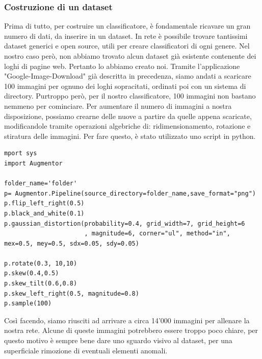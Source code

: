 \documentclass[twoside]{supsistudent}
\newcommand{\Decaa}{\newline\vspace{0.5mm}\newline\noindent}
\begin{document}
\subsubsection{Costruzione di un dataset}
Prima di tutto, per costruire un classificatore, è fondamentale ricavare un gran numero di dati, da inserire in un dataset.
In rete è possibile trovare tantissimi dataset generici e open source, utili per creare classificatori di ogni genere.
Nel nostro caso però, non abbiamo trovato alcun dataset già esistente contenente dei loghi di pagine web. Pertanto lo abbiamo creato noi.\Decaa
Tramite l'applicazione "Google-Image-Download" già descritta in precedenza, siamo andati a scaricare 100 immagini per ognuno dei loghi sopracitati, ordinati poi con un sistema di directory. Purtroppo però, per il nostro classificatore, 100 immagini non bastano nemmeno per cominciare. Per aumentare il numero di immagini a nostra disposizione, possiamo crearne delle nuove a partire da quelle appena scaricate, modificandole tramite operazioni algebriche di: ridimensionamento, rotazione e stiratura delle immagini. Per fare questo, è stato utilizzato uno script in python.
\begin{lstlisting}
mport sys
import Augmentor

folder_name='folder'
p= Augmentor.Pipeline(source_directory=folder_name,save_format="png")
p.flip_left_right(0.5)
p.black_and_white(0.1)
p.gaussian_distortion(probability=0.4, grid_width=7, grid_height=6
                      , magnitude=6, corner="ul", method="in", mex=0.5, mey=0.5, sdx=0.05, sdy=0.05)

p.rotate(0.3, 10,10)
p.skew(0.4,0.5)
p.skew_tilt(0.6,0.8)
p.skew_left_right(0.5, magnitude=0.8)
p.sample(100)
\end{lstlisting}
Così facendo, siamo riusciti ad arrivare a circa 14'000 immagini per allenare la nostra rete.
Alcune di queste immagini potrebbero essere troppo poco chiare, per questo motivo è sempre bene dare uno sguardo visivo al dataset, per una superficiale rimozione di eventuali elementi anomali.
\end{document}
